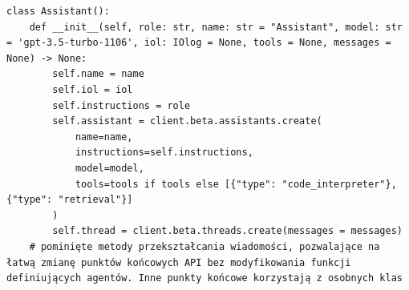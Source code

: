 \begin{listing}
    \begin{verbatim}
class Assistant():
    def __init__(self, role: str, name: str = "Assistant", model: str = 'gpt-3.5-turbo-1106', iol: IOlog = None, tools = None, messages = None) -> None:
        self.name = name
        self.iol = iol
        self.instructions = role
        self.assistant = client.beta.assistants.create(
            name=name,
            instructions=self.instructions,
            model=model,
            tools=tools if tools else [{"type": "code_interpreter"}, {"type": "retrieval"}]
        )
        self.thread = client.beta.threads.create(messages = messages)
    # pominięte metody przekształcania wiadomości, pozwalające na łatwą zmianę punktów końcowych API bez modyfikowania funkcji definiujących agentów. Inne punkty końcowe korzystają z osobnych klas


\end{verbatim}
\end{listing}
